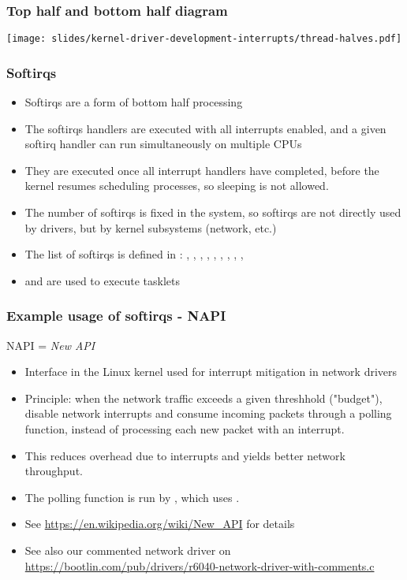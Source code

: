 \begin{frame}
  \frametitle{Top half and bottom half diagram}
  \begin{center}
    \texttt{[image: slides/kernel-driver-development-interrupts/thread-halves.pdf]}
  \end{center}
\end{frame}

\begin{frame}
  \frametitle{Softirqs}
  \begin{itemize}
  \item Softirqs are a form of bottom half processing
  \item The softirqs handlers are executed with all interrupts
    enabled, and a given softirq handler can run simultaneously on
    multiple CPUs
  \item They are executed once all interrupt handlers have completed,
    before the kernel resumes scheduling processes, so sleeping is not
    allowed.
  \item The number of softirqs is fixed in the system, so softirqs are
    not directly used by drivers, but by kernel subsystems (network,
    etc.)
  \item The list of softirqs is defined in
    : , ,
    , , ,
    , ,
    , , 
  \item {} and  are used to execute
    tasklets
  \end{itemize}
\end{frame}

\begin{frame}
  \frametitle{Example usage of softirqs - NAPI}
  NAPI = {\em New API}
  \begin{itemize}
  \item Interface in the Linux kernel used for interrupt mitigation in
        network drivers
  \item Principle: when the network traffic exceeds a given threshhold
        ("budget"), disable network interrupts and consume incoming packets
        through a polling function, instead of processing each new
        packet with an interrupt.
  \item This reduces overhead due to interrupts and yields better
        network throughput.
  \item The polling function is run by , which uses
        .
  \item See \url{https://en.wikipedia.org/wiki/New_API} for details
  \item See also our commented network driver on
        \url{https://bootlin.com/pub/drivers/r6040-network-driver-with-comments.c}
  \end{itemize}

\end{frame}

